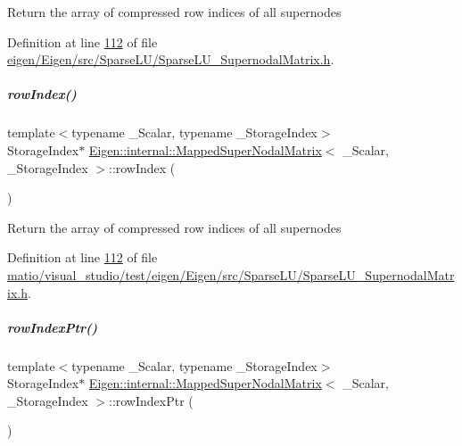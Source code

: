 Return the array of compressed row indices of all supernodes 

Definition at line \hyperlink{eigen_2_eigen_2src_2_sparse_l_u_2_sparse_l_u___supernodal_matrix_8h_source_l00112}{112} of file \hyperlink{eigen_2_eigen_2src_2_sparse_l_u_2_sparse_l_u___supernodal_matrix_8h_source}{eigen/\+Eigen/src/\+Sparse\+L\+U/\+Sparse\+L\+U\+\_\+\+Supernodal\+Matrix.\+h}.

\mbox{\label{group___sparse_l_u___module_a8e6b4f399aa468a10e58db627d43a12a}} 
\subparagraph{\texorpdfstring{row\+Index()}{rowIndex()}\hspace{0.1cm}{\footnotesize\ttfamily [2/2]}}
{\footnotesize\ttfamily template$<$typename \+\_\+\+Scalar, typename \+\_\+\+Storage\+Index$>$ \\
Storage\+Index$\ast$ \hyperlink{group___sparse_l_u___module_class_eigen_1_1internal_1_1_mapped_super_nodal_matrix}{Eigen\+::internal\+::\+Mapped\+Super\+Nodal\+Matrix}$<$ \+\_\+\+Scalar, \+\_\+\+Storage\+Index $>$\+::row\+Index (\begin{DoxyParamCaption}{ }\end{DoxyParamCaption})\hspace{0.3cm}{\ttfamily [inline]}}

Return the array of compressed row indices of all supernodes 

Definition at line \hyperlink{matio_2visual__studio_2test_2eigen_2_eigen_2src_2_sparse_l_u_2_sparse_l_u___supernodal_matrix_8h_source_l00112}{112} of file \hyperlink{matio_2visual__studio_2test_2eigen_2_eigen_2src_2_sparse_l_u_2_sparse_l_u___supernodal_matrix_8h_source}{matio/visual\+\_\+studio/test/eigen/\+Eigen/src/\+Sparse\+L\+U/\+Sparse\+L\+U\+\_\+\+Supernodal\+Matrix.\+h}.

\mbox{\label{group___sparse_l_u___module_a826186a823bf49f81b20673cce741250}} 
\subparagraph{\texorpdfstring{row\+Index\+Ptr()}{rowIndexPtr()}\hspace{0.1cm}{\footnotesize\ttfamily [1/2]}}
{\footnotesize\ttfamily template$<$typename \+\_\+\+Scalar, typename \+\_\+\+Storage\+Index$>$ \\
Storage\+Index$\ast$ \hyperlink{group___sparse_l_u___module_class_eigen_1_1internal_1_1_mapped_super_nodal_matrix}{Eigen\+::internal\+::\+Mapped\+Super\+Nodal\+Matrix}$<$ \+\_\+\+Scalar, \+\_\+\+Storage\+Index $>$\+::row\+Index\+Ptr (\begin{DoxyParamCaption}{ }\end{DoxyParamCaption})\hspace{0.3cm}{\ttfamily [inline]}}

